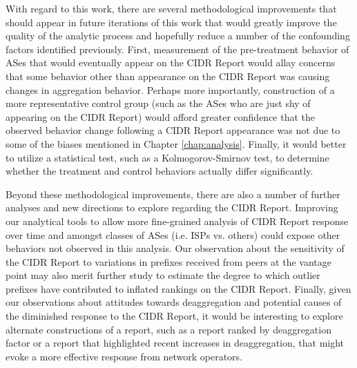 With regard to this work, there are several methodological improvements that
should appear in future iterations of this work that would greatly improve the
quality of the analytic process and hopefully reduce a number of the
confounding factors identified previously. First, measurement of the
pre-treatment behavior of ASes that would eventually appear on the CIDR Report
would allay concerns that some behavior other than appearance on the CIDR
Report was causing changes in aggregation behavior. Perhaps more importantly,
construction of a more representative control group (such as the ASes who are
just shy of appearing on the CIDR Report) would afford greater confidence that
the observed behavior change following a CIDR Report appearance was not due to
some of the biases mentioned in Chapter \ref{chap:analysis}. Finally, it would
better to utilize a statistical test, such as a Kolmogorov-Smirnov test, to
determine whether the treatment and control behaviors actually differ
significantly.

Beyond these methodological improvements, there are also a number of further
analyses and new directions to explore regarding the CIDR Report. Improving our
analytical tools to allow more fine-grained analysis of CIDR Report response
over time and amongst classes of ASes (i.e. ISPs vs. others) could expose other
behaviors not observed in this analysis. Our observation about the sensitivity
of the CIDR Report to variations in prefixes received from peers at the vantage
point may also merit further study to estimate the degree to which outlier
prefixes have contributed to inflated rankings on the CIDR Report.  Finally,
given our observations about attitudes towards deaggregation and potential
causes of the diminished response to the CIDR Report, it would be interesting
to explore alternate constructions of a report, such as a report ranked by
deaggregation factor or a report that highlighted recent increases in
deaggregation, that might evoke a more effective response from network
operators.


